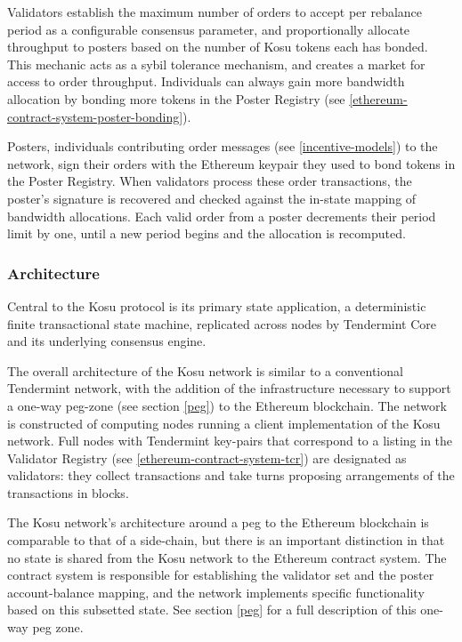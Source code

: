 \documentclass[10pt]{article}
\begin{document}
Validators establish the maximum number of orders to accept per rebalance period as a configurable consensus parameter, and proportionally allocate throughput to posters based on the number of Kosu tokens each has bonded. This mechanic acts as a sybil tolerance mechanism, and creates a market for access to order throughput. Individuals can always gain more bandwidth allocation by bonding more tokens in the Poster Registry (see \ref{ethereum-contract-system-poster-bonding}).
\medskip

Posters, individuals contributing order messages (see \ref{incentive-models}) to the network, sign their orders with the Ethereum keypair they used to bond tokens in the Poster Registry. When validators process these order transactions, the poster’s signature is recovered and checked against the in-state mapping of bandwidth allocations. Each valid order from a poster decrements their period limit by one, until a new period begins and the allocation is recomputed.
\subsubsection{Architecture}\label{tm-network-architecture}
Central to the Kosu protocol is its primary state application, a deterministic finite transactional state machine, replicated across nodes by Tendermint Core and its underlying consensus engine. 
\medskip

The overall architecture of the Kosu network is similar to a conventional Tendermint network, with the addition of the infrastructure necessary to support a one-way peg-zone (see section \ref{peg}) to the Ethereum blockchain. The network is constructed of computing nodes running a client implementation of the Kosu network. Full nodes with Tendermint key-pairs that correspond to a listing in the Validator Registry (see \ref{ethereum-contract-system-tcr}) are designated as validators: they collect transactions and take turns proposing arrangements of the transactions in blocks. 
\medskip

The Kosu network’s architecture around a peg to the Ethereum blockchain is comparable to that of a side-chain, but there is an important distinction in that no state is shared from the Kosu network to the Ethereum contract system. The contract system is responsible for establishing the validator set and the poster account-balance mapping, and the network implements specific functionality based on this subsetted state. See section \ref{peg} for a full description of this one-way peg zone.
\medskip
\end{document}
